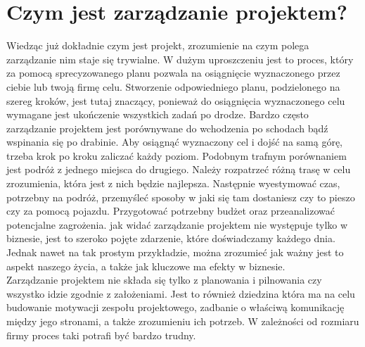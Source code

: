 \documentclass[oneside,polski,logo]{amuthesis}
\begin{document}
\section {Czym jest zarządzanie projektem?}
Wiedząc już dokładnie czym jest projekt, zrozumienie na czym polega zarządzanie nim staje się trywialne. W dużym uproszczeniu jest to proces,  który za pomocą sprecyzowanego planu pozwala na osiągnięcie wyznaczonego przez ciebie lub twoją firmę celu. Stworzenie odpowiedniego planu, podzielonego na szereg kroków, jest tutaj znaczący, ponieważ do osiągnięcia wyznaczonego celu wymagane jest ukończenie wszystkich zadań po drodze. Bardzo często zarządzanie projektem jest porównywane do wchodzenia po schodach bądź wspinania się po drabinie. Aby osiągnąć wyznaczony cel i dojść na samą górę, trzeba krok po kroku zaliczać każdy poziom. Podobnym trafnym porównaniem jest podróż z jednego miejsca do drugiego. Należy rozpatrzeć różną trasę w celu zrozumienia, która jest z nich będzie najlepsza. Następnie wyestymować czas, potrzebny na podróż, przemyśleć sposoby w jaki się tam dostaniesz czy to pieszo czy za pomocą pojazdu. Przygotować potrzebny budżet oraz przeanalizować potencjalne zagrożenia. jak widać zarządzanie projektem nie występuje tylko w biznesie, jest to szeroko pojęte zdarzenie, które doświadczamy każdego dnia. Jednak nawet na tak prostym przykładzie, można zrozumieć jak ważny jest to aspekt naszego życia, a także jak kluczowe ma efekty w biznesie.\cite{zarzadzanie7}\\
 
Zarządzanie projektem nie składa się tylko z planowania i pilnowania czy wszystko idzie zgodnie z założeniami. Jest to również dziedzina która ma na celu budowanie motywacji zespołu projektowego, zadbanie o właściwą komunikację między jego stronami, a także zrozumieniu ich potrzeb. W zależności od rozmiaru firmy proces taki potrafi być bardzo trudny.\\
\end{document}
